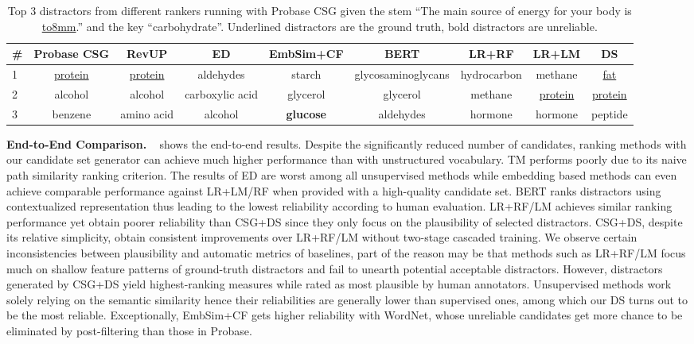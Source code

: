 \begin{table}[t!]%
	\footnotesize
	\centering
	\begin{tabular}{lcccccccc} %
		\toprule
		\# &Probase CSG  &RevUP &ED  & EmbSim+CF &BERT & LR+RF & LR+LM & \textbf{DS}\\
		\midrule
		1 &\underline{protein}   &\underline{protein}  &aldehydes  &starch &glycosaminoglycans  & hydrocarbon &methane    & \underline{fat}\\
		\midrule
		2 &alcohol  &alcohol  &carboxylic acid  &glycerol  &glycerol &methane  &\underline{protein}    &\underline{protein} \\
		\midrule
		3 &benzene  &amino acid  &alcohol   &\textbf{glucose}  &aldehydes &hormone  &hormone   &peptide \\
		\bottomrule
	\end{tabular}
	\caption{Top 3 distractors from different rankers running with Probase CSG
		given the stem ``The main source of energy for your body is \underline{\hbox to8mm{}}.'' and the key ``carbohydrate''. Underlined distractors are the ground truth, bold distractors are unreliable.}
	\label{table:example}
\end{table}
\textbf{End-to-End Comparison.} ~ shows the end-to-end results.
Despite the significantly reduced number of candidates, ranking methods with our candidate set generator can achieve much higher performance than with unstructured vocabulary. TM performs poorly due to its naive path similarity ranking criterion. The results of ED are worst among all unsupervised methods while embedding based methods can even achieve comparable performance against LR+LM/RF when provided with a high-quality candidate set.
BERT ranks distractors using contextualized representation thus leading to the lowest reliability according to human evaluation. 
LR+RF/LM achieves similar ranking performance yet obtain poorer reliability than CSG+DS since they only focus on the plausibility of selected distractors. CSG+DS, despite its relative simplicity, obtain consistent improvements over LR+RF/LM without two-stage cascaded training.
We observe certain inconsistencies between plausibility and automatic metrics of baselines, part of the reason may be that methods such as LR+RF/LM focus much on shallow feature patterns of ground-truth distractors and fail to unearth potential acceptable distractors.
However, distractors generated by CSG+DS yield highest-ranking measures while rated as most plausible by human annotators. 
Unsupervised methods work solely relying on the semantic similarity hence their reliabilities are generally lower than supervised ones, among which our DS turns out to be the most reliable. Exceptionally, EmbSim+CF gets higher reliability with WordNet, whose unreliable candidates get more chance to be eliminated by post-filtering than those in Probase.

